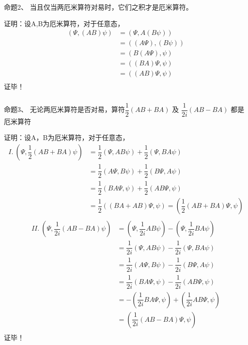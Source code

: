 \begin{frame} [allowframebreaks=]
    \frametitle{}
    \begin{tcolorbox1}{命题2、}
        当且仅当两厄米算符对易时，它们之积才是厄米算符。
    \end{tcolorbox1}
    \alert{证明：}设A,B为厄米算符，对于任意态，
    \begin{equation*}
        \begin{split}
            (\Psi, (AB)\psi ) &= (\Psi, A(B\psi) ) \\  
            &=((A \Psi), (B\psi) )  \\
            &=(B(A \Psi), \psi )  \\
            &=( (BA) \Psi, \psi )  \\
            &=( (AB) \Psi, \psi )  \\
         \end{split}
    \end{equation*}  
    证毕！
\end{frame}  

\begin{frame} [allowframebreaks=]
    \frametitle{}
    \begin{tcolorbox1}{命题3、}
        无论两厄米算符是否对易，算符$\dfrac{1}{2}(AB+BA)$ 及 $\dfrac{1}{2i}(AB-BA) $ 都是厄米算符
    \end{tcolorbox1}
    \alert{证明：}设A，B为厄米算符，对于任意态，
    \begin{equation*}
        \begin{split}
            I.~ (\Psi, \dfrac{1}{2}(AB+BA)\psi ) &=\dfrac{1}{2}(\Psi, AB\psi) + \dfrac{1}{2}(\Psi, BA\psi)  \\
            &=\dfrac{1}{2}(A\Psi, B\psi) + \dfrac{1}{2}(B\Psi, A\psi)  \\
            &=\dfrac{1}{2}(BA\Psi, \psi) + \dfrac{1}{2}(AB\Psi, \psi)  \\
            &=\dfrac{1}{2}((BA+AB)\Psi, \psi) =(\dfrac{1}{2}(AB+BA)\Psi, \psi)\\
         \end{split}
    \end{equation*}  
    \begin{equation*}
        \begin{split}
            II.~ (\Psi, \dfrac{1}{2i}(AB-BA)\psi ) &= (\Psi, \dfrac{1}{2i}AB\psi) - (\Psi, \dfrac{1}{2i}BA\psi)\\  
            &=\dfrac{1}{2i}(\Psi, AB\psi) - \dfrac{1}{2i}(\Psi, BA\psi)  \\
            &=\dfrac{1}{2i}(A\Psi, B\psi) - \dfrac{1}{2i}(B\Psi, A\psi)  \\
            &=\dfrac{1}{2i}(BA\Psi, \psi) - \dfrac{1}{2i}(AB\Psi, \psi)  \\
            &=-(\dfrac{1}{2i}BA\Psi, \psi) +(\dfrac{1}{2i}AB\Psi, \psi)  \\
            &=(\dfrac{1}{2i}(AB-BA)\Psi, \psi) \\
         \end{split}
    \end{equation*}  
    证毕！
\end{frame}  

